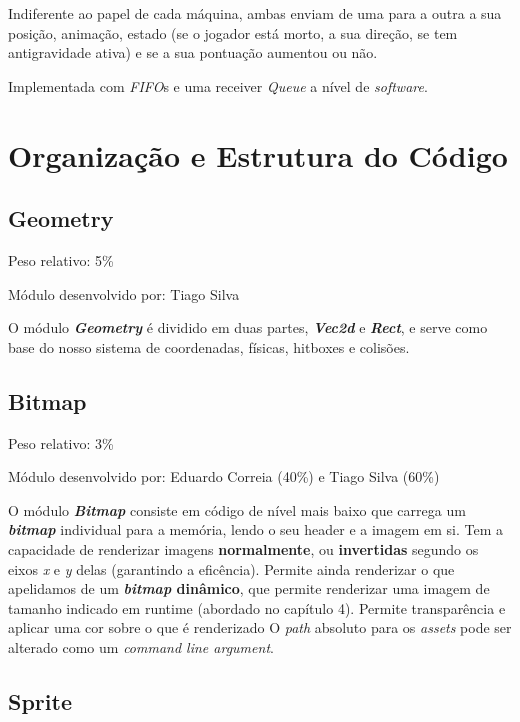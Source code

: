 \documentclass{report}
\begin{document}
Indiferente ao papel de cada máquina, ambas enviam de uma para a outra a sua posição, animação, estado (se o jogador está morto, a sua direção, se tem antigravidade ativa) e se a sua pontuação aumentou ou não.

Implementada com \textit{FIFO}s e uma receiver \textit{Queue} a nível de \textit{software}.

\chapter{Organização e Estrutura do Código}

\section{Geometry}

Peso relativo: 5\%

Módulo desenvolvido por: Tiago Silva
\newline

O módulo \textbf{\textit{Geometry}} é dividido em duas partes, \textbf{\textit{Vec2d}} e \textbf{\textit{Rect}}, e serve como base do nosso sistema de coordenadas, físicas, hitboxes e colisões. 

\section{Bitmap}

Peso relativo: 3\%

Módulo desenvolvido por: Eduardo Correia (40\%) e Tiago Silva (60\%)
\newline

O módulo \textbf{\textit{Bitmap}} consiste em código de nível mais baixo que carrega um \textbf{\textit{bitmap}} individual para a memória, lendo o seu header e a imagem em si.
Tem a capacidade de renderizar imagens \textbf{normalmente}, ou \textbf{invertidas} segundo os eixos \textit{x} e \textit{y} delas (garantindo a eficência). Permite ainda renderizar o que apelidamos de um \textbf{\textit{bitmap} dinâmico}, que permite renderizar uma imagem de tamanho indicado em runtime (abordado no capítulo 4).
Permite transparência e aplicar uma cor sobre o que é renderizado
O \textit{path} absoluto para os \textit{assets} pode ser alterado como um \textit{command line argument}.
 
\section{Sprite}
\end{document}
